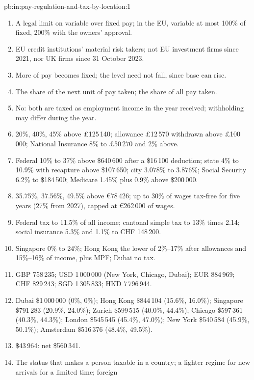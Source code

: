 \begin{solution}{pb:in:pay-regulation-and-tax-by-location:1}
\begin{enumerate}
\item A legal limit on variable over fixed pay; in the EU, variable at most 100\% of fixed, 200\% with the owners' approval.
\item EU credit institutions' material risk takers; not EU investment firms since 2021, nor UK firms since 31 October 2023.
\item More of pay becomes fixed; the level need not fall, since base can rise.
\item The share of the next unit of pay taken; the share of all pay taken.
\item No: both are taxed as employment income in the year received; withholding may differ during the year.
\item 20\%, 40\%, 45\% above \pounds125\,140; allowance \pounds12\,570 withdrawn above \pounds100\,000; National Insurance 8\% to
\pounds50\,270 and 2\% above.
\item Federal 10\% to 37\% above \$640\,600 after a \$16\,100 deduction; state 4\% to 10.9\% with recapture above \$107\,650;
city 3.078\% to 3.876\%; Social Security 6.2\% to \$184\,500; Medicare 1.45\% plus 0.9\% above \$200\,000.
\item 35.75\%, 37.56\%, 49.5\% above \euro78\,426; up to 30\% of wages tax-free for five years (27\% from 2027), capped at
\euro262\,000 of wages.
\item Federal tax to 11.5\% of all income; cantonal simple tax to 13\% times 2.14; social insurance 5.3\% and 1.1\% to CHF
148\,200.
\item Singapore 0\% to 24\%; Hong Kong the lower of 2\%--17\% after allowances and 15\%--16\% of income, plus MPF; Dubai no tax.
\item GBP 758\,235; USD 1\,000\,000 (New York, Chicago, Dubai); EUR 884\,969; CHF 829\,243; SGD 1\,305\,833; HKD 7\,796\,944.
\item Dubai \$1\,000\,000 (0\%, 0\%); Hong Kong \$844\,104 (15.6\%, 16.0\%); Singapore \$791\,283 (20.9\%, 24.0\%); Zurich
\$599\,515 (40.0\%, 44.4\%); Chicago \$597\,361 (40.3\%, 44.3\%); London \$545\,545 (45.4\%, 47.0\%); New York \$540\,584
(45.9\%, 50.1\%); Amsterdam \$516\,376 (48.4\%, 49.5\%).
\item \$43\,964: net \$560\,341.
\item The status that makes a person taxable in a country; a lighter regime for new arrivals for a limited time; foreign

\end{enumerate}
\end{solution}
